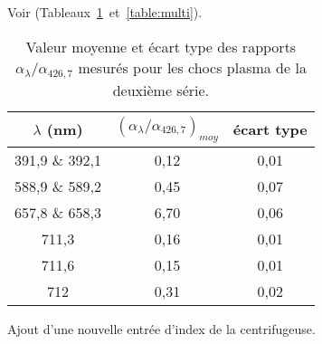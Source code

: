 Voir (Tableaux~\ref{table:alpha}~et~\ref{table:multi}).
\lipsum[3]
\begin{table}[h!tbp]
\begin{center}
\begin{tabular}{|c | c | c |}
\hline
$\lambda$ (nm) & $(\alpha_{\lambda}/\alpha_{426,7})_{moy}$ & écart type \\
\hline
391,9 \& 392,1 & 0,12 & 0,01 \\
588,9 \& 589,2 & 0,45 & 0,07 \\
657,8 \& 658,3 & 6,70 & 0,06 \\
711,3 & 0,16 & 0,01 \\
711,6 & 0,15 & 0,01 \\
712 & 0,31 & 0,02 \\
\hline
\end{tabular}
\end{center}
\caption[Valeur moyenne et écart type des rapports $\alpha_{\lambda}/\alpha_{426,7}$]{Valeur moyenne et écart type des rapports $\alpha_{\lambda}/\alpha_{426,7}$ mesurés pour les chocs plasma de la deuxième série.}
\label{table:alpha}
\end{table}

\lipsum[2]

Ajout d'une nouvelle entrée d'index de la centrifugeuse.
